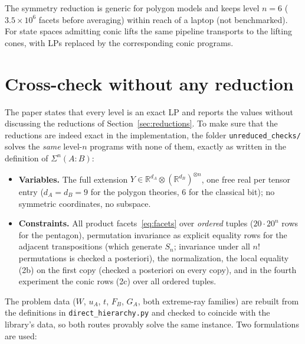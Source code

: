\documentclass[11pt,a4paper]{article}
\newcommand*{\code}[1]{\texttt{#1}}
\theoremstyle{remark}
\begin{document}
The symmetry reduction is generic for polygon models and keeps level
$n=6$ ($3.5\times 10^6$ facets before averaging) within reach of a laptop
(not benchmarked). For state spaces admitting conic lifts the same pipeline
transports to the lifting cones, with LPs replaced by the corresponding
conic programs.

\section{Cross-check without any reduction}\label{sec:unreduced}

The paper states that every level is an exact LP and reports the values
without discussing the reductions of Section~\ref{sec:reductions}. To make
sure that the reductions are indeed exact in the implementation, the folder
\code{unreduced\_checks/} solves the \emph{same} level-$n$ programs with
none of them, exactly as written in the definition of $\Sigma^n(A:B)$:
\begin{itemize}[leftmargin=1.5em]
\item \textbf{Variables.} The full extension $Y\in\mathbb{R}^{d_A}\otimes
(\mathbb{R}^{d_B})^{\otimes n}$, one free real per tensor entry
($d_A=d_B=9$ for the polygon theories, $6$ for the classical bit); no
symmetric coordinates, no subspace.
\item \textbf{Constraints.} All product facets~\eqref{eq:facets} over
\emph{ordered} tuples ($20\cdot 20^n$ rows for the pentagon), permutation
invariance as explicit equality rows for the adjacent transpositions
(which generate $S_n$; invariance under all $n!$ permutations is checked a
posteriori), the normalization, the local equality (2b) on the first copy
(checked a posteriori on every copy), and in the fourth experiment the
conic rows (2c) over all ordered tuples.
\end{itemize}
The problem data ($W$, $u_A$, $t$, $F_B$, $G_A$, both extreme-ray
families) are rebuilt from the definitions in
\code{direct\_hierarchy.py} and checked to coincide with the library's
data, so both routes provably solve the same instance. Two formulations
are used:
\end{document}
